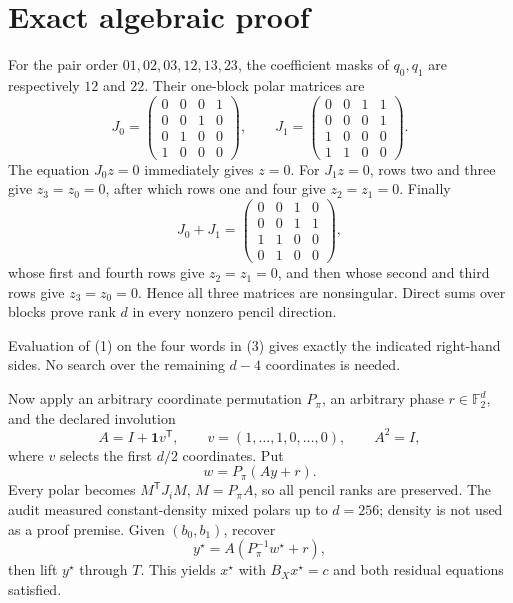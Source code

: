 \documentclass[11pt]{article}
\newcommand{\F}{\mathbb F_2}
\begin{document}
\section{Exact algebraic proof}
For the pair order \(01,02,03,12,13,23\), the coefficient masks of
\(q_0,q_1\) are respectively \(12\) and \(22\).  Their one-block polar
matrices are
\[
J_0=\begin{pmatrix}
0&0&0&1\\0&0&1&0\\0&1&0&0\\1&0&0&0
\end{pmatrix},\qquad
J_1=\begin{pmatrix}
0&0&1&1\\0&0&0&1\\1&0&0&0\\1&1&0&0
\end{pmatrix}.                                                  \tag{4}
\]
The equation \(J_0z=0\) immediately gives \(z=0\).  For \(J_1z=0\), rows
two and three give \(z_3=z_0=0\), after which rows one and four give
\(z_2=z_1=0\).  Finally
\[
J_0+J_1=\begin{pmatrix}
0&0&1&0\\0&0&1&1\\1&1&0&0\\0&1&0&0
\end{pmatrix},                                                   \tag{5}
\]
whose first and fourth rows give \(z_2=z_1=0\), and then whose second and
third rows give \(z_3=z_0=0\).  Hence all three matrices are nonsingular.
Direct sums over blocks prove rank \(d\) in every nonzero pencil direction.

Evaluation of (1) on the four words in (3) gives exactly the indicated
right-hand sides.  No search over the remaining \(d-4\) coordinates is
needed.

Now apply an arbitrary coordinate permutation \(P_\pi\), an arbitrary phase
\(r\in\F^d\), and the declared involution
\[
 A=I+\mathbf 1v^{\mathsf T},\qquad
 v=(1,\ldots,1,0,\ldots,0),\qquad A^2=I,                         \tag{6}
\]
where \(v\) selects the first \(d/2\) coordinates.  Put
\[
 w=P_\pi(Ay+r).                                                  \tag{7}
\]
Every polar becomes \(M^{\mathsf T}J_iM\), \(M=P_\pi A\), so all pencil
ranks are preserved.  The audit measured constant-density mixed polars up
to \(d=256\); density is not used as a proof premise.  Given \((b_0,b_1)\),
recover
\[
 y^\star=A(P_\pi^{-1}w^\star+r),                                \tag{8}
\]
then lift \(y^\star\) through \(T\).  This yields \(x^\star\) with
\(B_Xx^\star=c\) and both residual equations satisfied.
\end{document}
